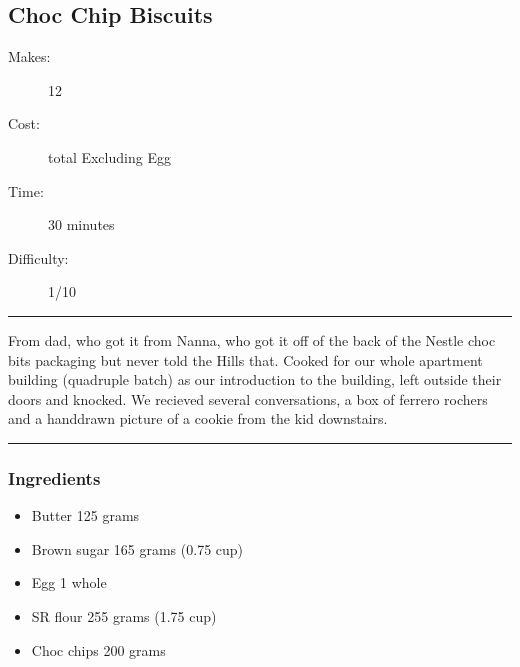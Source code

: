 \documentclass[]{article}
\begin{document}
\subsection*{\center\huge Choc Chip Biscuits}
\begin{description}
\item[Makes:] 12 
\item[Cost:]  total Excluding Egg
\item[Time:] 30 minutes
\item[Difficulty:] 1/10
\end{description}
\vspace{0.2cm}\hrule\vspace{0.5cm}
\begin{adjustwidth}{0.5 cm}{0.5 cm}

From dad, who got it from Nanna, who got it off of the back of the Nestle choc bits packaging but never told the Hills that. Cooked for our whole apartment building (quadruple batch) as our introduction to the building, left outside their doors and knocked. We recieved several conversations, a box of ferrero rochers and a handdrawn picture of a cookie from the kid downstairs. \hfill{}\color{black}

\end{adjustwidth}
\vspace{0.5cm}\hrule
\subsubsection*{\Large Ingredients}
\begin{multicols}{2}
\begin{itemize}
 \item Butter \hfill 125 grams
 \item Brown sugar \hfill 165 grams (0.75 cup)
 \item Egg \hfill 1 whole
 \item SR flour \hfill 255 grams (1.75 cup)
 \item Choc chips \hfill 200 grams
\end{itemize}
\end{multicols}
\end{document}
